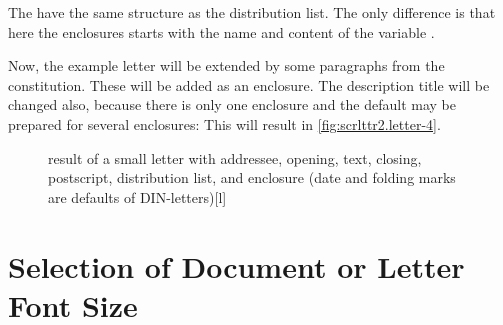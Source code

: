 \begin{Declaration}
\end{Declaration}
The  have the same structure as the distribution list.
The only difference is that here the enclosures starts with the name
and content of the variable
.
\begin{Example}
  Now, the example letter will be extended by some paragraphs from the
  constitution. These will be added as an enclosure. The description title
  will be changed also, because there is only one enclosure and the default
  may be prepared for several enclosures:
  This will result in \autoref{fig:scrlttr2.letter-4}.
  \begin{figure}
    \setcapindent{0pt}%
    \begin{captionbeside}{%
        result of a small letter with addressee, opening, text, closing,
        postscript, distribution list, and enclosure
        (date and folding marks are defaults of DIN-letters)}[l]
    \end{captionbeside}
    \label{fig:scrlttr2.letter-4}
  \end{figure}
\end{Example}
%
\EndIndexGroup
%
\EndIndexGroup


\section{Selection of Document or Letter Font Size}

